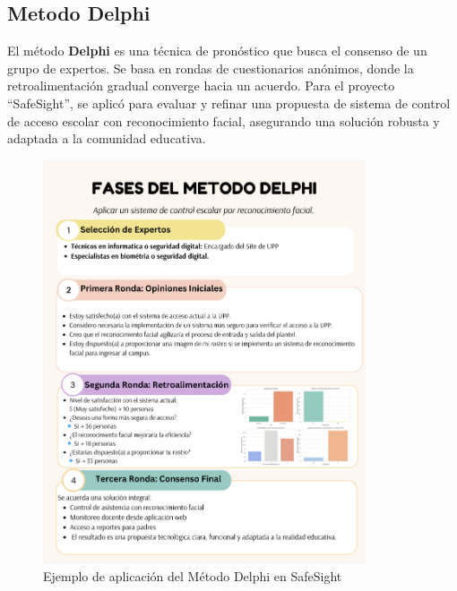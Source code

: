 \subsection{Metodo Delphi}

El método \textbf{Delphi} es una técnica de pronóstico que busca el consenso de un grupo de expertos. Se basa en rondas de cuestionarios anónimos, donde la retroalimentación gradual converge hacia un acuerdo. Para el proyecto ``SafeSight'', se aplicó para evaluar y refinar una propuesta de sistema de control de acceso escolar con reconocimiento facial, asegurando una solución robusta y adaptada a la comunidad educativa.

\begin{figure}[H]
    \centering
    \includegraphics[width=0.85\textwidth]{./Delphi.png}
    \caption{Ejemplo de aplicación del Método Delphi en SafeSight}
    \label{fig:delphi}
\end{figure}